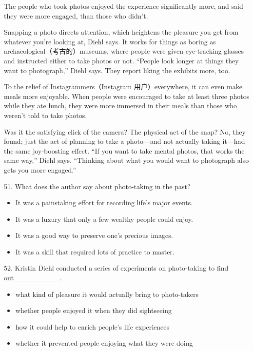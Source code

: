 \documentclass[UTF8,11pt]{ctexart}
\begin{document}
The people who took photos enjoyed the experience significantly more, and said they were more engaged, than those who didn’t.


Snapping a photo directs attention, which heightens the pleasure you get from whatever you’re looking at, Diehl says. It works for things as boring as archaeological（考古的）museums, where people were given eye-tracking glasses and instructed either to take photos or not. “People look longer at things they want to photograph,” Diehl says. They report liking the exhibits more, too.


To the relief of Instagrammers（Instagram 用户）everywhere, it can even make meals more enjoyable. When people were encouraged to take at least three photos while they ate lunch, they were more immersed in their meals than those who weren’t told to take photos.


Was it the satisfying click of the camera? The physical act of the snap? No, they found; just the act of planning to take a photo—and not actually taking it—had the same joy-boosting effect. “If you want to take mental photos, that works the same way,” Diehl says. “Thinking about what you would want to photograph also gets you more engaged.”


51. What does the author say about photo-taking in the past?


\begin{itemize}[leftmargin=2em,itemsep=.2em,topsep=.4em]\item[A.] It was a painstaking effort for recording life’s major events.
\item[B.] It was a luxury that only a few wealthy people could enjoy.
\item[C.] It was a good way to preserve one’s precious images.
\item[D.] It was a skill that required lots of practice to master.
\end{itemize}

52. Kristin Diehl conducted a series of experiments on photo-taking to find out\_\_\_\_\_\_\_\_\_.


\begin{itemize}[leftmargin=2em,itemsep=.2em,topsep=.4em]\item[A.] what kind of pleasure it would actually bring to photo-takers
\item[B.] whether people enjoyed it when they did sightseeing
\item[C.] how it could help to enrich people’s life experiences
\item[D.] whether it prevented people enjoying what they were doing
\end{itemize}
\end{document}
